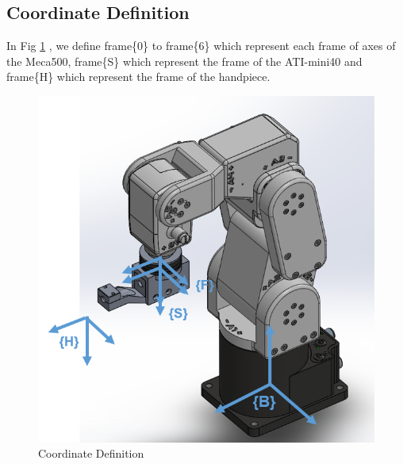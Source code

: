 \subsection{Coordinate Definition}
\hspace*{6mm}In Fig \ref{fig:frames} , we define frame\{0\} to frame\{6\} which represent each frame of axes of the Meca500, frame\{S\} which represent the frame of the ATI-mini40 and frame\{H\} which represent the frame of the handpiece.
\begin{figure}[htbp]
\begin{center}
\includegraphics[width=0.72\linewidth]{Images/Coordinates.png}
\caption{
Coordinate Definition
}\label{fig:frames}
\end{center}
\end{figure} 
